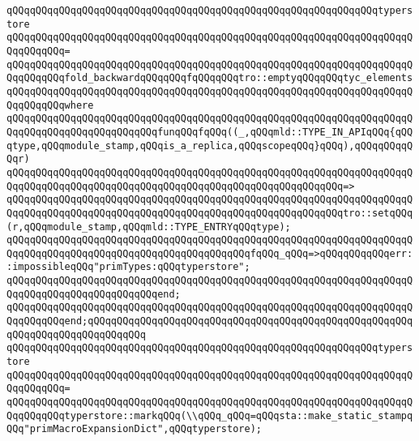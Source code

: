 \newline
\verb|qQQqqQQqqQQqqQQqqQQqqQQqqQQqqQQqqQQqqQQqqQQqqQQqqQQqqQQqqQQqqQQqtyperstore|\newline
\verb|qQQqqQQqqQQqqQQqqQQqqQQqqQQqqQQqqQQqqQQqqQQqqQQqqQQqqQQqqQQqqQQqqQQqqQQqqQQqqQQq=|\newline
\verb|qQQqqQQqqQQqqQQqqQQqqQQqqQQqqQQqqQQqqQQqqQQqqQQqqQQqqQQqqQQqqQQqqQQqqQQqqQQqqQQqfold_backwardqQQqqQQqfqQQqqQQqtro::emptyqQQqqQQqtyc_elements|\newline
\verb|qQQqqQQqqQQqqQQqqQQqqQQqqQQqqQQqqQQqqQQqqQQqqQQqqQQqqQQqqQQqqQQqqQQqqQQqqQQqqQQqwhere|\newline
\verb|qQQqqQQqqQQqqQQqqQQqqQQqqQQqqQQqqQQqqQQqqQQqqQQqqQQqqQQqqQQqqQQqqQQqqQQqqQQqqQQqqQQqqQQqqQQqqQQqfunqQQqfqQQq((_,qQQqmld::TYPE_IN_APIqQQq{qQQqtype,qQQqmodule_stamp,qQQqis_a_replica,qQQqscopeqQQq}qQQq),qQQqqQQqqQQqr)|\newline
\verb|qQQqqQQqqQQqqQQqqQQqqQQqqQQqqQQqqQQqqQQqqQQqqQQqqQQqqQQqqQQqqQQqqQQqqQQqqQQqqQQqqQQqqQQqqQQqqQQqqQQqqQQqqQQqqQQqqQQqqQQqqQQqqQQq=>|\newline
\verb|qQQqqQQqqQQqqQQqqQQqqQQqqQQqqQQqqQQqqQQqqQQqqQQqqQQqqQQqqQQqqQQqqQQqqQQqqQQqqQQqqQQqqQQqqQQqqQQqqQQqqQQqqQQqqQQqqQQqqQQqqQQqqQQqtro::setqQQq(r,qQQqmodule_stamp,qQQqmld::TYPE_ENTRYqQQqtype);|\newline
\newline
\verb|qQQqqQQqqQQqqQQqqQQqqQQqqQQqqQQqqQQqqQQqqQQqqQQqqQQqqQQqqQQqqQQqqQQqqQQqqQQqqQQqqQQqqQQqqQQqqQQqqQQqqQQqqQQqqQQqfqQQq_qQQq=>qQQqqQQqqQQqerr::impossibleqQQq"primTypes:qQQqtyperstore";|\newline
\verb|qQQqqQQqqQQqqQQqqQQqqQQqqQQqqQQqqQQqqQQqqQQqqQQqqQQqqQQqqQQqqQQqqQQqqQQqqQQqqQQqqQQqqQQqqQQqqQQqend;|\newline
\verb|qQQqqQQqqQQqqQQqqQQqqQQqqQQqqQQqqQQqqQQqqQQqqQQqqQQqqQQqqQQqqQQqqQQqqQQqqQQqqQQqend;qQQqqQQqqQQqqQQqqQQqqQQqqQQqqQQqqQQqqQQqqQQqqQQqqQQqqQQqqQQqqQQqqQQqqQQqqQQqqQQq|\newline
\newline
\verb|qQQqqQQqqQQqqQQqqQQqqQQqqQQqqQQqqQQqqQQqqQQqqQQqqQQqqQQqqQQqqQQqtyperstore|\newline
\verb|qQQqqQQqqQQqqQQqqQQqqQQqqQQqqQQqqQQqqQQqqQQqqQQqqQQqqQQqqQQqqQQqqQQqqQQqqQQqqQQq=|\newline
\verb|qQQqqQQqqQQqqQQqqQQqqQQqqQQqqQQqqQQqqQQqqQQqqQQqqQQqqQQqqQQqqQQqqQQqqQQqqQQqqQQqtyperstore::markqQQq(\\qQQq_qQQq=qQQqsta::make_static_stampqQQq"primMacroExpansionDict",qQQqtyperstore);|\newline
